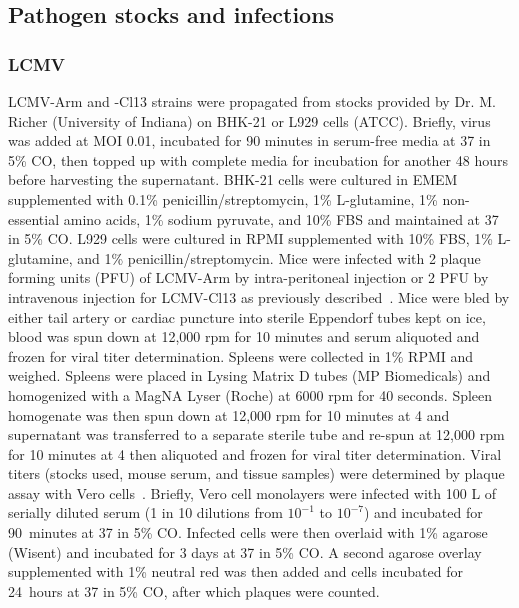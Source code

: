 \subsection{Pathogen stocks and infections}

\subsubsection{LCMV}

LCMV-Arm and -Cl13 strains were propagated from stocks provided by Dr. M. Richer (University of Indiana) on BHK-21 or L929 cells (ATCC). Briefly, virus was added at MOI 0.01, incubated for 90 minutes in serum-free media at 37 in 5\% CO, then topped up with complete media for incubation for another 48 hours before harvesting the supernatant. BHK-21 cells were cultured in EMEM supplemented with 0.1\% penicillin/streptomycin, 1\% L-glutamine, 1\% non-essential amino acids, 1\% sodium pyruvate, and 10\% FBS and maintained at 37 in 5\% CO. L929 cells were cultured in RPMI supplemented with 10\% FBS, 1\% L-glutamine, and 1\% penicillin/streptomycin. Mice were infected with 2 plaque forming units (PFU) of LCMV-Arm by intra-peritoneal injection or 2 PFU by intravenous injection for LCMV-Cl13 as previously described~\cite{wherry2003viral,richer2013pathogen}. Mice were bled by either tail artery or cardiac puncture into sterile Eppendorf tubes kept on ice, blood was spun down at 12,000 rpm for 10 minutes and serum aliquoted and frozen for viral titer determination. Spleens were collected in 1\% RPMI and weighed. Spleens were placed in Lysing Matrix D tubes (MP Biomedicals) and homogenized with a MagNA Lyser (Roche) at 6000 rpm for 40 seconds. Spleen homogenate was then spun down at 12,000 rpm for 10 minutes at 4 and supernatant was transferred to a separate sterile tube and re-spun at 12,000 rpm for 10 minutes at 4 then aliquoted and frozen for viral titer determination. Viral titers (stocks used, mouse serum, and tissue samples) were determined by plaque assay with Vero cells~\cite{ahmed1984selection}. Briefly, Vero cell monolayers were infected with 100 \textmu{}L of serially diluted serum (1 in 10 dilutions from $10^{-1}$ to $10^{-7}$) and incubated for 90~minutes at 37 in 5\% CO. Infected cells were then overlaid with 1\% agarose (Wisent) and incubated for 3 days at 37 in 5\% CO. A second agarose overlay supplemented with 1\% neutral red was then added and cells incubated for 24~hours at 37 in 5\% CO, after which plaques were counted.

